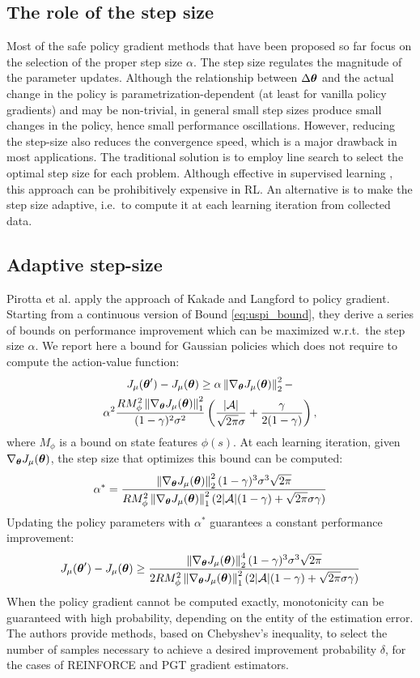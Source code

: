 \subsection{The role of the step size}
Most of the safe policy gradient methods that have been proposed so far focus on the selection of the proper step size $\alpha$.
The step size regulates the magnitude of the parameter updates. Although the relationship between $\Delta\vtheta$ and the actual change in the policy is parametrization-dependent (at least for vanilla policy gradients) and may be non-trivial, in general small step sizes produce small changes in the policy, hence small performance oscillations. However, reducing the step-size also reduces the convergence speed, which is a major drawback in most applications. 
The traditional solution is to employ line search to select the optimal step size for each problem. Although effective in supervised learning \cite{More:1994:LSA:192115.192132}, this approach can be prohibitively expensive in \ac{RL}. 
An alternative is to make the step size adaptive, i.e.\ to compute it at each learning iteration from collected data.

\subsection{Adaptive step-size}\label{sec:adaptive_ss}
Pirotta et al. \cite{NIPS2013_5186} apply the approach of Kakade and Langford \cite{kakade2002approximately} to policy gradient. Starting from a continuous version of Bound \ref{eq:uspi_bound}, they derive a series of bounds on performance improvement which can be maximized w.r.t.\ the step size $\alpha$. We report here a bound for Gaussian policies which does not require to compute the action-value function:
\begin{multline}\label{eq:pirotta_bound2}
J_{\mu}(\vtheta')-J_{\mu}(\vtheta) \geq \alpha\norm[2]{\gradJ{\vtheta}}^2 - \\
	\alpha^2\frac{RM_\phi^2\norm[1]{\gradJ{\vtheta}}^2}{(1-\gamma)^2\sigma^2}
	\left(\frac{|\mathcal{A}|}{\sqrt{2\pi}\sigma} + \frac{\gamma}{2(1-\gamma)}\right),
\end{multline}
where $M_\phi$ is a bound on state features $\phi(s)$.
At each learning iteration, given $\gradJ{\vtheta}$, the step size that optimizes this bound can be computed:
\[
\alpha^* = \frac{\norm[2]{\gradJ{\vtheta}}^2(1-\gamma)^3\sigma^3\sqrt{2\pi}}
	{RM_\phi^2\norm[1]{\gradJ{\vtheta}}^2(2|\mathcal{A}|(1-\gamma)+\sqrt{2\pi}\sigma\gamma)}
\] 
Updating the policy parameters with $\alpha^*$ guarantees a constant performance improvement:
\[
J_{\mu}(\vtheta')-J_{\mu}(\vtheta) \geq
	\frac{\norm[2]{\gradJ{\vtheta}}^4(1-\gamma)^3\sigma^3\sqrt{2\pi}}
	{2RM_\phi^2\norm[1]{\gradJ{\vtheta}}^2(2|\mathcal{A}|(1-\gamma)+\sqrt{2\pi}\sigma\gamma)}
\]
When the policy gradient cannot be computed exactly, monotonicity can be guaranteed with high probability, depending on the entity of the estimation error. The authors provide methods, based on Chebyshev's inequality, to select the number of samples necessary to achieve a desired improvement probability $\delta$, for the cases of REINFORCE and PGT gradient estimators.
